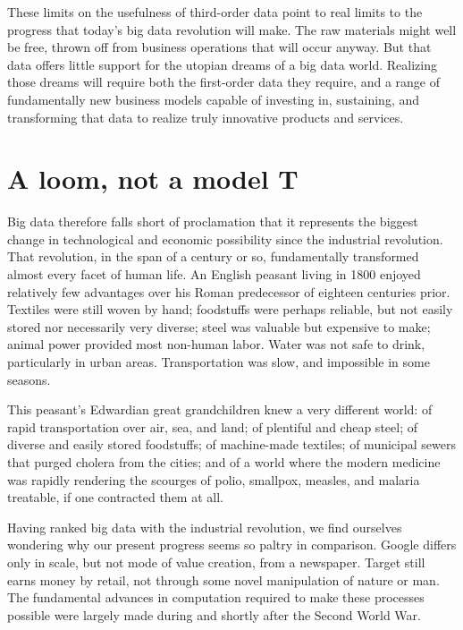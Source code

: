 \documentclass[12pt]{article}
\begin{document}
These limits on the usefulness of third-order data point to real
limits to the progress that today's big data revolution will make. The
raw materials might well be free, thrown off from business operations
that will occur anyway. But that data offers little support for the
utopian dreams of a big data world. Realizing those dreams will
require both the first-order data they require, and a range of
fundamentally new business models capable of investing in, sustaining,
and transforming that data to realize truly innovative products and
services. 

\section{A loom, not a model T}
\label{sec:loom-not-model}

Big data therefore falls short of proclamation that it represents the
biggest change in technological and economic possibility since the
industrial revolution. That revolution, in the span of a century or
so, fundamentally transformed almost every facet of human life. An
English peasant living in 1800 enjoyed relatively few advantages over
his Roman predecessor of eighteen centuries prior. Textiles were still
woven by hand; foodstuffs were perhaps reliable, but not easily stored
nor necessarily very diverse; steel was valuable but expensive to
make; animal power provided most non-human labor. Water was not safe
to drink, particularly in urban areas. Transportation was slow, and
impossible in some seasons.

This peasant's Edwardian great grandchildren knew a very different
world: of rapid transportation over air, sea, and land; of plentiful
and cheap steel; of diverse and easily stored foodstuffs; of
machine-made textiles; of municipal sewers that purged cholera from
the cities; and of a world where the modern medicine
was rapidly rendering the scourges of polio, smallpox, measles,
and malaria treatable, if one contracted them at all. 

Having ranked big data with the industrial revolution, we find
ourselves wondering why our present progress seems so paltry in
comparison. Google differs only in scale, but not mode of value
creation, from a newspaper. Target still earns money by retail, not
through some novel manipulation of nature or man. The fundamental
advances in computation required to make these processes possible were
largely made during and shortly after the Second World War. 

\end{document}
